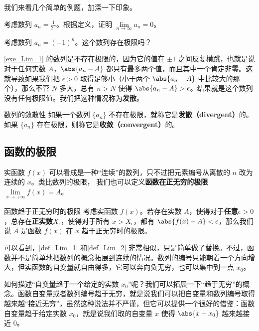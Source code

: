 我们来看几个简单的例题，加深一下印象。

\begin{exercise}{}
考虑数列 $a_n=\frac{1}{2^n}$。根据定义，证明 $\lim\limits_{n\to\infty}a_n=0$。
\end{exercise}

\begin{exercise}{}\label{exe_Lim_1}
考虑数列 $a_n=(-1)^n$。这个数列存在极限吗？
\end{exercise}

\autoref{exe_Lim_1} 的数列是不存在极限的，因为它的值在 $\pm 1$ 之间反复横跳，也就是说对于任何实数 $A$，$\abs{a_n-A}$ 都只有最多两个值，而且其中一个肯定非零。这就导致如果我们把 $\epsilon>0$ 取得足够小（小于两个 $\abs{a_n-A}$ 中比较大的那个），那么不管 $N$ 多大，总有 $n>N$ 使得 $\abs{a_n-A}>\epsilon$。结果就是这个数列没有任何极限值。我们把这种情况称为\textbf{发散}。

\begin{definition}{数列的敛散性}\label{def_Lim_4}
如果一个数列 $\{a_n\}$ 不存在极限，就称它是\textbf{发散（divergent）}的。如果 $\{a_n\}$ 存在极限，则称它是\textbf{收敛（convergent）}的。
\end{definition}

\subsection{函数的极限}
实函数 $f(x)$ 可以看成是一种“连续”的数列，只不过把元素编号从离散的 $n$ 改为连续的 $x$。类比数列的极限， 我们也可以定义\textbf{函数在正无穷的极限} $\lim\limits_{x\to +\infty} f(x) = A$。

\begin{definition}{函数趋于正无穷时的极限}\label{def_Lim_1}
考虑实函数 $f(x)$。若存在实数 $A$，使得对于\textbf{任意}$\epsilon>0$，总存在\textbf{正实数}$X_\epsilon$，使得对于所有 $x>X_\epsilon$，都有 $\abs{f(x)-A}<\epsilon$，那么我们说 $A$ 是函数 $f(x)$ 在 $x$ 趋于正无穷时的极限。
\end{definition}

可以看到，\autoref{def_Lim_1} 和\autoref{def_Lim_2} 非常相似，只是简单做了替换。不过，函数并不是简单地把数列的概念拓展到连续的情况。数列的编号只能朝着一个方向增大，但实函数的自变量就自由得多，它可以奔向负无穷，也可以集中到一点 $x_0$。

如何描述“自变量趋于一个给定的实数 $x_0$”呢？我们可以拓展一下“趋于无穷”的概念。函数自变量或者数列编号趋于无穷，就是说我们可以把自变量和数列编号取得越来越“接近无穷”，虽然这种说法并不严谨，但它可以提供一个很好的借鉴：函数自变量趋于给定实数 $x_0$，就是说我们取的自变量 $x$ 使得 $\abs{x-x_0}$ 越来越接近 $0$。

